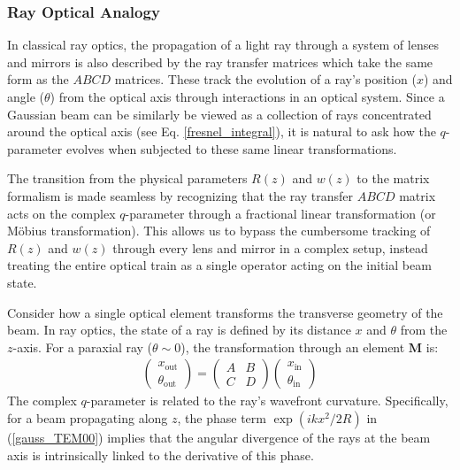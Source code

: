 \subsubsection{Ray Optical Analogy}
In classical ray optics, the propagation of a light ray through a system of lenses and mirrors is also described by the ray transfer matrices \cite{book_lasers_siegman} which take the same form as the $ABCD$ matrices. These track the evolution of a ray's position ($x$) and angle ($\theta$) from the optical axis through interactions in an optical system. Since a Gaussian beam can be similarly be viewed as a collection of rays concentrated around the optical axis (see Eq. \ref{fresnel_integral}), it is natural to ask how the $q$-parameter evolves when subjected to these same linear transformations.

The transition from the physical parameters $R(z)$ and $w(z)$ to the matrix formalism is made seamless by recognizing that the ray transfer $ABCD$ matrix acts on the complex $q$-parameter through a fractional linear transformation (or Möbius transformation). This allows us to bypass the cumbersome tracking of $R(z)$ and $w(z)$ through every lens and mirror in a complex setup, instead treating the entire optical train as a single operator acting on the initial beam state.

Consider how a single optical element transforms the transverse geometry of the beam. In ray optics, the state of a ray is defined by its distance $x$ and $\theta$ from the $z$-axis. For a paraxial ray ($\theta\sim0$), the transformation through an element $\mathbf{M}$ is:
\begin{align}
	\begin{pmatrix} x_{\text{out}} \\ \theta_{\text{out}} \end{pmatrix} = \begin{pmatrix} A & B \\ C & D \end{pmatrix} \begin{pmatrix} x_{\text{in}} \\ \theta_{\text{in}} \end{pmatrix}
\end{align}
The complex $q$-parameter is related to the ray's wavefront curvature. Specifically, for a beam propagating along $z$, the phase term $\exp(ikx^2/2R)$ in (\ref{gauss_TEM00}) implies that the angular divergence of the rays at the beam axis is intrinsically linked to the derivative of this phase.

